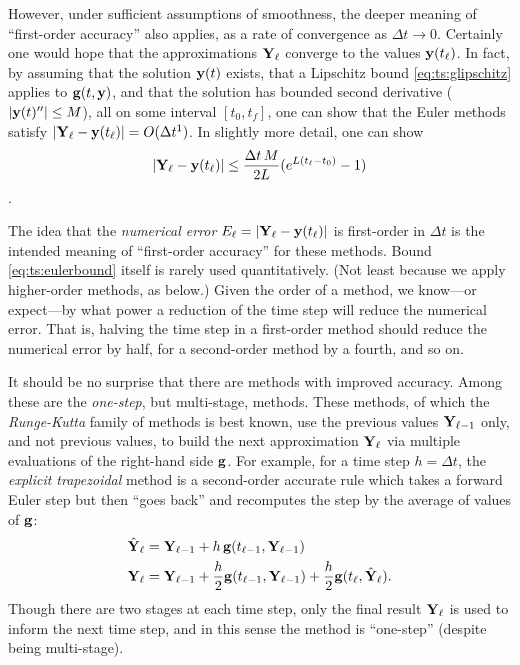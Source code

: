 However, under sufficient assumptions of smoothness, the deeper meaning of ``first-order accuracy'' also applies, as a rate of convergence as $\Delta t\to 0$.  Certainly one would hope that the approximations $\mathbf{Y}_\ell$ converge to the values $\mathbf{y}(t_\ell)$.  In fact, by assuming that the solution $\mathbf{y}(t)$ exists, that a Lipschitz bound \eqref{eq:ts:glipschitz} applies to $\mathbf{g}(t,\mathbf{y})$, and that the solution has bounded second derivative ($|\mathbf{y}(t)''|\le M$), all on some interval $[t_0,t_f]$, one can show that the Euler methods satisfy $|\mathbf{Y}_\ell-\mathbf{y}(t_\ell)| = O(\Delta t^1)$.  In slightly more detail, one can show
\begin{equation}
|\mathbf{Y}_\ell-\mathbf{y}(t_\ell)| \le \frac{\Delta t\,M}{2L} (e^{L(t_\ell-t_0)}-1)  \label{eq:ts:eulerbound}
\end{equation}
\citep{AscherPetzold1998}.

The idea that the \emph{numerical error} $E_\ell = |\mathbf{Y}_\ell-\mathbf{y}(t_\ell)|$ is first-order in $\Delta t$ is the intended meaning of ``first-order accuracy'' for these methods.  Bound \eqref{eq:ts:eulerbound} itself is rarely used quantitatively.  (Not least because we apply higher-order methods, as below.)  Given the order of a method, we know---or expect---by what power a reduction of the time step will reduce the numerical error.  That is, halving the time step in a first-order method should reduce the numerical error by half, for a second-order method by a fourth, and so on.

It should be no surprise that there are methods with improved accuracy.  Among these are the \emph{one-step}, but multi-stage, methods.  These methods, of which the \emph{Runge-Kutta} family of methods is best known, use the previous values $\mathbf{Y}_{\ell-1}$ only, and not previous values, to build the next approximation $\mathbf{Y}_\ell$ via multiple evaluations of the right-hand side $\mathbf{g}$.  For example, for a time step $h=\Delta t$, the \emph{explicit trapezoidal} method \citep{AscherPetzold1998} is a second-order accurate rule which takes a forward Euler step but then ``goes back'' and recomputes the step by the average of values of $\mathbf{g}$:
\begin{align}
\hat{\mathbf{Y}}_\ell &= \mathbf{Y}_{\ell-1} + h\, \mathbf{g}(t_{\ell-1},\mathbf{Y}_{\ell-1}) \label{eq:ts:rk2a} \\
\mathbf{Y}_\ell &= \mathbf{Y}_{\ell-1} + \frac{h}{2} \mathbf{g}(t_{\ell-1},\mathbf{Y}_{\ell-1}) + \frac{h}{2} \mathbf{g}(t_\ell,\hat{\mathbf{Y}}_\ell). \notag
\end{align}
Though there are two stages at each time step, only the final result $\mathbf{Y}_\ell$ is used to inform the next time step, and in this sense the method is ``one-step'' (despite being multi-stage).

